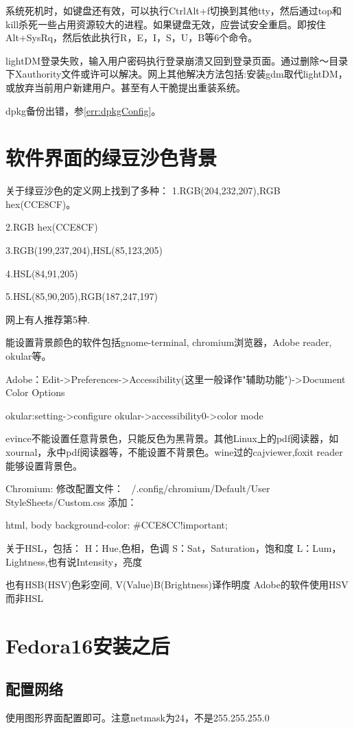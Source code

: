 系统死机时，如键盘还有效，可以执行CtrlAlt+f切换到其他tty，然后通过top和kill杀死一些占用资源较大的进程。如果键盘无效，应尝试安全重启。即按住Alt+SysRq，然后依此执行R，E，I，S，U，B等6个命令。

lightDM登录失败，输入用户密码执行登录崩溃又回到登录页面。通过删除～目录下Xauthority文件或许可以解决。网上其他解决方法包括:安装gdm取代lightDM，或放弃当前用户新建用户。甚至有人干脆提出重装系统。


dpkg备份出错，参\ref{err:dpkgConfig}。


\section{软件界面的绿豆沙色背景}
关于绿豆沙色的定义网上找到了多种：
1.RGB(204,232,207),RGB hex(CCE8CF)。

2.RGB hex(CCE8CF)

3.RGB(199,237,204),HSL(85,123,205)

4.HSL(84,91,205)

5.HSL(85,90,205),RGB(187,247,197)

网上有人推荐第5种.

能设置背景颜色的软件包括gnome-terminal, chromium浏览器，Adobe reader, okular等。


Adobe：Edit->Preferences->Accessibility(这里一般译作"辅助功能")->Document Color Options

okular:setting->configure okular->accessibility0->color mode

evince不能设置任意背景色，只能反色为黑背景。其他Linux上的pdf阅读器，如xournal，永中pdf阅读器等，不能设置不背景色。wine过的cajviewer,foxit reader能够设置背景色。



Chromium:
修改配置文件：
~/.config/chromium/Default/User StyleSheets/Custom.css
添加：
\begin{shellcmd}
html, body {background-color: #CCE8CC!important;}
\end{shellcmd}



关于HSL，包括：
H：Hue,色相，色调
S：Sat，Saturation，饱和度
L：Lum，Lightness,也有说Intensity，亮度

也有HSB(HSV)色彩空间,
V(Value)B(Brightness)译作明度
Adobe的软件使用HSV而非HSL
\newpage
\section{Fedora16安装之后}
\subsection{配置网络}
使用图形界面配置即可。注意netmask为24，不是255.255.255.0
